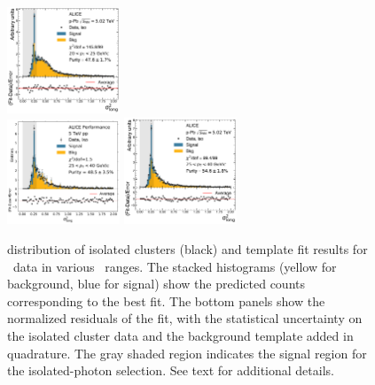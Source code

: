 \begin{figure}[hbtp]
\includegraphics[width=0.3\textwidth]{Data_Analysis/Purity/tf-example-p-Pb-cluster_Lambda-20-25.pdf}
\\
\includegraphics[width=0.3\textwidth]{Data_Analysis/Purity/tf-example-pp-cluster_Lambda-25-40.pdf}
\includegraphics[width=0.3\textwidth]{Data_Analysis/Purity/tf-example-p-Pb-cluster_Lambda-25-40.pdf}
\caption{\lambdasquare distribution of isolated clusters (black) and template fit results for \pPb~data in various \pt~ranges. The stacked histograms (yellow for background, blue for signal) show the predicted counts corresponding to the best fit. The bottom panels show the normalized residuals of the fit, with the statistical uncertainty on the isolated cluster data and the background template added in quadrature. The gray shaded region indicates the signal region for the isolated-photon selection. See text for additional details.}
\label{fig:TemplateFit}
\end{figure}

